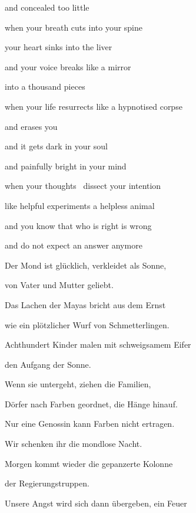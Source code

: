 and concealed too little


\bigskip

when your breath cuts into your spine

your heart sinks into the liver

and your voice breaks like a mirror

into a thousand pieces


\bigskip

when your life resurrects like a hypnotised corpse

and erases you

and it gets dark in your soul

and painfully bright in your mind


\bigskip

when your thoughts \ dissect your intention

like helpful experiments a helpless animal

and you know that who is right is wrong 

and do not expect an answer anymore



\bigskip

Der Mond ist glücklich, verkleidet als Sonne,

von Vater und Mutter geliebt.


\bigskip

Das Lachen der Mayas bricht aus dem Ernst

wie ein plötzlicher Wurf von Schmetterlingen.


\bigskip

Achthundert Kinder malen mit schweigsamem Eifer

den Aufgang der Sonne.


\bigskip

Wenn sie untergeht, ziehen die Familien,

Dörfer nach Farben geordnet, die Hänge hinauf.


\bigskip

Nur eine Genossin kann Farben nicht ertragen. 

Wir schenken ihr die mondlose Nacht.


\bigskip

Morgen kommt wieder die gepanzerte Kolonne

der Regierungstruppen.


\bigskip

Unsere Angst wird sich dann übergeben, ein Feuer

